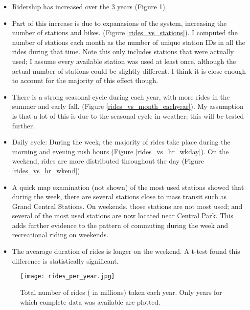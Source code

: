 \documentclass[11pt]{article}
\begin{document}
\begin{itemize}

\item Ridership has increased over the 3 years (Figure \ref{rides_vs_year}).%

\item  Part of this increase is due to expanasions of the system, increasing the number of stations and bikes. (Figure \ref{rides_vs_stations}). I computed the number of stations each month as the number of unique station IDs in all the rides during that time. Note this only includes stations that were actually used; I assume every available station was used at least once, although the actual number of stations could be slightly different. I think it is close enough to account for the majority of this effect though.

\item There is a strong seasonal cycle during each year, with more rides in the summer and early fall. (Figure \ref{rides_vs_month_eachyear}). My assumption is that a lot of this is due to the seasonal cycle in weather; this will be tested further.

\item Daily cycle: During the week, the majority of rides take place during the morning and evening rush hours (Figure \ref{rides_vs_hr_wkday}). On the weekend, rides are more distributed throughout the day (Figure \ref{rides_vs_hr_wkend}).

\item A quick map examination (not shown) of the most used stations showed that during the week, there are several stations close to mass transit such as Grand Central Stations. On weekends, those stations are not most used; and several of the most used stations are now located near Central Park. This adds further evidence to the pattern of commuting during the week and recreational riding on weekends.

\item The avearage duration of rides is longer on the weekend. A t-test found this difference is statistically significant.

\end{itemize}



\begin{figure}[htb]
\texttt{[image: rides\_per\_year.jpg]}
\caption{Total number of rides ( in millions) taken each year. Only years for which complete data was available are plotted.}
\label{rides_vs_year}
\end{figure}
\end{document}
